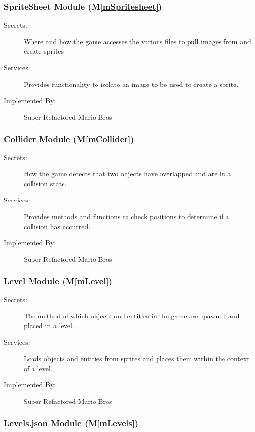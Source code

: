 \documentclass[12pt, titlepage]{article}
\newcommand{\mref}[1]{M\ref{#1}}
\begin{document}
\subsubsection{SpriteSheet Module (\mref{mSpritesheet})}

\begin{description}
\item[Secrets:] Where and how the game accesses the various files to pull images from and create sprites
\item[Services:] Provides functionality to isolate an image to be used to create a sprite.
\item[Implemented By:] Super Refactored Mario Bros
\end{description}

\subsubsection{Collider Module (\mref{mCollider})}

\begin{description}
\item[Secrets:] How the game detects that two objects have overlapped and are in a collision state.
\item[Services:] Provides methods and functions to check positions to determine if a collision has occurred.
\item[Implemented By:] Super Refactored Mario Bros
\end{description}

\subsubsection{Level Module (\mref{mLevel})}

\begin{description}
\item[Secrets:] The method of which objects and entities in the game are spawned and placed in a level.
\item[Services:] Loads objects and entities from sprites and places them within the context of a level. 
\item[Implemented By:] Super Refactored Mario Bros
\end{description}

\subsubsection{Levels.json Module (\mref{mLevels})}
\end{document}
